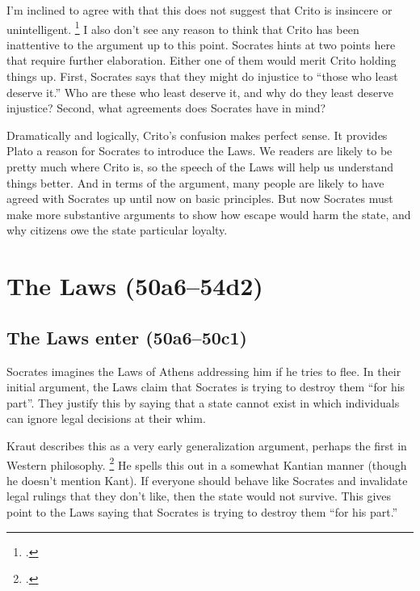 \documentclass[12pt,letterpaper]{article}
\begin{document}
I'm inclined to agree with that this does not suggest that Crito is insincere or unintelligent.%
\footcite[][211--212]{brickhouse-smith2004-plato-trial-of-socrates}
I also don't see any reason to think that Crito has been inattentive to the argument up to this point.
Socrates hints at two points here that require further elaboration.
Either one of them would merit Crito holding things up.
First, Socrates says that they might do injustice to ``those who least deserve it.''
Who are these who least deserve it, and why do they least deserve injustice?
Second, what agreements does Socrates have in mind?

Dramatically and logically, Crito's confusion makes perfect sense.
It provides Plato a reason for Socrates to introduce the Laws.
We readers are likely to be pretty much where Crito is, so the speech of the Laws will help us understand things better.
And in terms of the argument, many people are likely to have agreed with Socrates up until now on basic principles.
But now Socrates must make more substantive arguments to show how escape would harm the state, and why citizens owe the state particular loyalty.


\section*{The Laws (50a6--54d2)}

\subsection*{The Laws enter (50a6--50c1)}

Socrates imagines the Laws of Athens addressing him if he tries to flee.
In their initial argument, the Laws claim that Socrates is trying to destroy them ``for his part''.
They justify this by saying that a state cannot exist in which individuals can ignore legal decisions at their whim.

Kraut describes this as a very early generalization argument, perhaps the first in Western philosophy.%
\footcite[][42]{kraut-socrates-state-1984}
He spells this out in a somewhat Kantian manner (though he doesn't mention Kant).
If everyone should behave like Socrates and invalidate legal rulings that they don't like, then the state would not survive.
This gives point to the Laws saying that Socrates is trying to destroy them ``for his part.''
\end{document}
